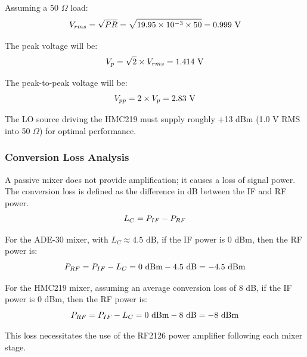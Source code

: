 \documentclass[12pt,a4paper]{report}
\begin{document}
	Assuming a 50 $\Omega$ load:
	\begingroup
	\setlength{\mathindent}{0pt}
	\begin{equation*}
		\hfill
		V_{rms} = \sqrt{PR} = \sqrt{19.95 \times 10^{-3} \times 50} = 0.999\ \text{V}
		\hfill
	\end{equation*}
	\endgroup
	
	The peak voltage will be:
	\begingroup
	\setlength{\mathindent}{0pt}
	\begin{equation*}
		\hfill
		V_p = \sqrt{2} \times V_{rms} = 1.414\ \text{V}
		\hfill
	\end{equation*}
	\endgroup
	
	The peak-to-peak voltage will be:
	\begingroup
	\setlength{\mathindent}{0pt}
	\begin{equation*}
		\hfill
		V_{pp} = 2 \times V_p = 2.83\ \text{V}
		\hfill
	\end{equation*}
	\endgroup
	
	The LO source driving the HMC219 must supply roughly +13 dBm (1.0 V RMS into 50 $\Omega$) for optimal performance.
	\subsubsection{Conversion Loss Analysis}
	A passive mixer does not provide amplification; it causes a loss of signal power. The conversion loss is defined as the difference in dB between the IF and RF power.
	\begingroup
	\setlength{\mathindent}{0pt}
	\begin{equation*}
		\hfill
		L_C = P_{IF} - P_{RF}
		\hfill
	\end{equation*}
	\endgroup
	
	For the ADE-30 mixer, with $L_C \approx 4.5$ dB, if the IF power is 0 dBm, then the RF power is:
	\begingroup
	\setlength{\mathindent}{0pt}
	\begin{equation*}
		\hfill
		P_{RF} = P_{IF} - L_C = 0\ \text{dBm} - 4.5\ \text{dB} = -4.5\ \text{dBm}
		\hfill
	\end{equation*}
	\endgroup
	
	For the HMC219 mixer, assuming an average conversion loss of 8 dB, if the IF power is 0 dBm, then the RF power is:
	\begingroup
	\setlength{\mathindent}{0pt}
	\begin{equation*}
		\hfill
		P_{RF} = P_{IF} - L_C = 0\ \text{dBm} - 8\ \text{dB} = -8\ \text{dBm}
		\hfill
	\end{equation*}
	\endgroup
	
	This loss necessitates the use of the RF2126 power amplifier following each mixer stage.
\end{document}
